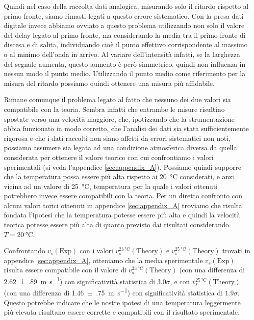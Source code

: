 \documentclass[
    prl,
    reprint, 
    superscriptaddress, 
    altaffilletter, 
    amsmath, 
    amssymb, 
    a4paper,
    varvw]{revtex4-2}
\begin{document}
Quindi nel caso della raccolta dati analogica, misurando solo il ritardo rispetto al primo fronte, siamo rimasti legati a questo errore sistematico. Con la presa dati digitale invece abbiamo ovviato a questo problema utilizzando non solo il valore del delay legato al primo fronte, ma considerando la media tra il primo fronte di discesa e di salita, individuando cioè il punto effettivo corrispondente al massimo o al minimo dell'onda in arrivo. Al variare dell'intensità infatti, se la larghezza del segnale aumenta, questo aumento è però simmetrico, quindi non influenza in nessun modo il punto medio. Utilizzando il punto medio come riferimento per la misura del ritardo possiamo quindi ottenere una misura più affidabile. 

Rimane comunque il problema legato al fatto che nessuno dei due valori sia compatibile con la teoria. Sembra infatti che entrambe le misure risultino spostate verso una velocità maggiore, che, ipotizzando che la strumentazione abbia funzionato in modo corretto, che l'analisi dei dati sia stata sufficientemente rigorosa e che i dati raccolti non siano affetti da errori sistematici non noti, possiamo assumere sia legata ad una condizione atmosferica diversa da quella considerata per ottenere il valore teorico con cui confrontiamo i valori sperimentali (si veda l'appendice \ref{sec:appendix_A}). Possiamo quindi supporre che la temperatura possa essere più alta rispetto ai \SI{20}{\celsius} considerati, e anzi vicina ad un valore di \SI{25}{\celsius}, temperatura per la quale i valori ottenuti potrebbero invece essere compatibili con la teoria. 
Per un diretto confronto con alcuni valori torici ottenuti in appendice \ref{sec:appendix_A} troviamo che risulta fondata l'ipotesi che la temperatura potesse essere più alta e quindi la velocità teorica potesse essere più alta di quanto previsto dai risultati considerando $T=\SI{20}{\celsius}$. 

Confrontando $v_s(\text{Exp})$ con i valori $v_s^{\SI{23}{\celsius}}(\text{Theory})$ e $v_s^{\SI{25}{\celsius}}(\text{Theory})$ trovati in appendice \ref{sec:appendix_A}, otteniamo che la media sperimentale $v_s(\text{Exp})$ risulta essere compatibile con il valore di $v_s^{\SI{23}{\celsius}}(\text{Theory})$ (con una differenza di \SI[separate-uncertainty=true]{2.62(89)}{\metre\per\second}) con significatività statistica di $3.0\sigma$, e con $v_s^{\SI{25}{\celsius}}(\text{Theory})$ (con una differenza di \SI[separate-uncertainty=true]{1.46(75)}{\metre\per\second}) con significatività statistica di $1.9\sigma$. Questo potrebbe indicare che le nostre ipotesi di una temperatura leggermente più elevata risultano essere corrette e compatibili con il risultato sperimentale.
\end{document}

